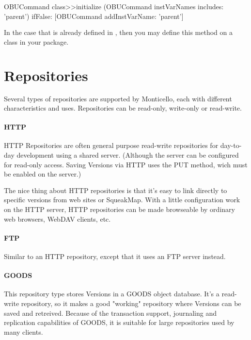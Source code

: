 \documentclass[a4paper,10pt,twoside]{book}
\begin{document}
\begin{code}

OBUCommand class>>initialize
	(OBUCommand instVarNames includes: 'parent') 
		ifFalse: [OBUCommand addInstVarName: 'parent']
\end{code}

In the case that  is already defined in , then you may define this  method on a class in your package.


\section{Repositories} 

Several types of repositories are supported by Monticello, each with different characteristics and uses. Repositories can be read-only, write-only or read-write.

\paragraph{HTTP} HTTP Repositories are often general purpose read-write repositories for day-to-day development using a shared server. (Although the server can be configured for read-only access. Saving Versions via HTTP uses the PUT method, wich must be enabled on the server.)

The nice thing about HTTP repositories is that it's easy to link directly to specific versions from web sites or SqueakMap. With a little configuration work on the HTTP server, HTTP repositories can be made browseable by ordinary web browsers, WebDAV clients, etc.

\paragraph{FTP} Similar to an HTTP repository, except that it uses an FTP server instead.

\paragraph{GOODS} This repository type stores Versions in a GOODS object database. It's a read-write repository, so it makes a good "working" repository where Versions can be saved and retreived. Because of the transaction support, journaling and replication capabilities of GOODS, it is suitable for large repositories used by many clients.
\end{document}

